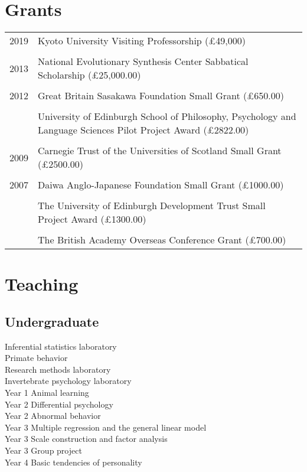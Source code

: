 \documentclass[11pt]{article}
\begin{document}
\section*{Grants}
\begin{tabular}{p{3cm}p{12cm}}
2019 & Kyoto University Visiting Professorship (£49,000) \\ \\
2013 & National Evolutionary Synthesis Center Sabbatical Scholarship
(£25,000.00) \\ \\
2012 & Great Britain Sasakawa Foundation Small Grant (£650.00) \\ \\
& University of Edinburgh School of Philosophy, Psychology and
Language Sciences Pilot Project Award (£2822.00) \\ \\
2009 & Carnegie Trust of the Universities of Scotland Small Grant
(£2500.00) \\ \\
2007 & Daiwa Anglo-Japanese Foundation Small Grant (£1000.00) \\ \\
& The University of Edinburgh Development Trust Small Project Award
(£1300.00) \\ \\
& The British Academy Overseas Conference Grant (£700.00)
\end{tabular}

\section*{Teaching}
\subsection*{Undergraduate}
Inferential statistics laboratory \\
Primate behavior \\
Research methods laboratory \\
Invertebrate psychology laboratory \\
Year 1 Animal learning \\
Year 2 Differential psychology \\
Year 2 Abnormal behavior \\
Year 3 Multiple regression and the general linear model \\
Year 3 Scale construction and factor analysis \\
Year 3 Group project \\
Year 4 Basic tendencies of personality
\end{document}
